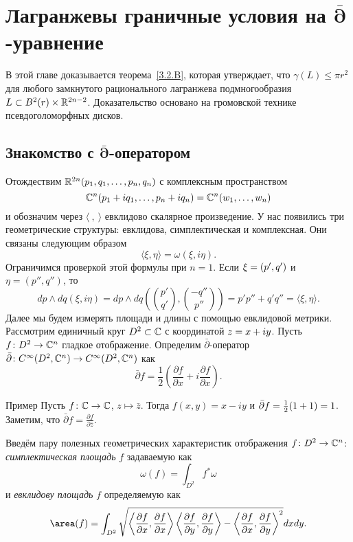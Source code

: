 \chapter
[\texorpdfstring{$\bm{\bar\partial}$-уравнение}{∂-уравнение}]
{Лагранжевы граничные условия на $\bm{\bar\partial}$-уравнение}

В этой главе доказывается теорема~\ref{3.2.B}, которая утверждает, что $\gamma (L) \le \pi r^2$ для любого замкнутого рационального лагранжева подмногообразия $L \subset B^2 (r) \times \mathbb{R}^{2n-2}$.
Доказательство основано на громовской технике псевдоголоморфных дисков.

\section[\texorpdfstring{Знакомство с $\bar\partial$-оператором}{Знакомство с ∂-оператором}]{Знакомство с $\bm{\bar\partial}$-оператором}\label{sec:4.1}

Отождествим $\mathbb{R}^{2n} (p_1,q_1,\dots, p_n, q_n)$ с комплексным пространством
\[\mathbb{C}^n (p_1 + iq_1,\dots, p_n + iq_n)
=
\mathbb{C}^n (w_1,\dots, w_n)\]
и обозначим через $\langle\ ,\  \rangle$ евклидово скалярное произведение.
У нас появились три геометрические структуры: евклидова, симплектическая и комплексная.
Они связаны следующим образом
\[\langle \xi, \eta\rangle = \omega (\xi, i\eta).\]
Ограничимся проверкой этой формулы при $n = 1$.
Если $\xi \z= (p', q')$ и $\eta = (p'', q'')$, то
\[dp\wedge dq(\xi, i\eta)
=
dp\wedge dq\left(\binom{p'}{q'},\binom{-q''}{p''}\right)
=
p' p'' + q' q''
=
\langle\xi, \eta\rangle.\]
Далее мы будем измерять площади и длины с помощью евклидовой метрики.
Рассмотрим единичный круг $D^2 \subset \mathbb{C}$ с координатой $z \z= x \z+ iy$.
Пусть $f\colon D^2 \to \mathbb{C}^n$ гладкое отображение.
Определим $\bar\partial$-оператор $\bar\partial\colon C^\infty (D^2, \mathbb{C}^n) \to C^\infty  (D^2, \mathbb{C}^n)$ как 
\[\bar\partial f=\frac12\left(\frac{\partial f}{\partial x} + i \frac{\partial f}{\partial x}\right).\]

\begin{ex*}{Пример}
Пусть $f\colon \mathbb{C} \to \mathbb{C}$, $z \mapsto \bar z$.
Тогда $f(x,y)=x-iy$ и $\bar\partial f \z= \tfrac12(1+1)=1$.
Заметим, что $\bar\partial f  = \frac{\partial f}{\partial \bar z}$.
\end{ex*}

Введём пару полезных геометрических характеристик отображения $f\colon D^2 \to \mathbb{C}^n$:
\emph{симплектическая площадь} $f$ задаваемую как
\[\omega(f) =\int_{D^2}f^\ast\omega\]
и \emph{евклидову площадь} $f$ определяемую как
\[\area(f)
=\int_{D^2}
\sqrt{
\left\langle\frac{\partial f}{\partial x},\frac{\partial f}{\partial x}\right\rangle
\left\langle \frac{\partial f}{\partial y},\frac{\partial f}{\partial y}\right\rangle
-
\left\langle\frac{\partial f}{\partial x},\frac{\partial f}{\partial y}\right\rangle^2
}
dxdy.
\]

